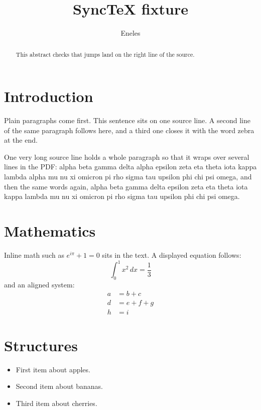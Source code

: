 \documentclass[11pt]{article}
\title{SyncTeX fixture}
\author{Eneles}
\begin{document}
\maketitle
\tableofcontents

\begin{abstract}
This abstract checks that jumps land on the right line of the source.
\end{abstract}

\section{Introduction}
Plain paragraphs come first. This sentence sits on one source line.
A second line of the same paragraph follows here,
and a third one closes it with the word zebra at the end.


One very long source line holds a whole paragraph so that it wraps over several lines in the PDF: alpha beta gamma delta alpha epsilon zeta eta theta iota kappa lambda alpha mu nu xi omicron pi rho sigma tau upsilon phi chi psi omega, and then the same words again, alpha beta gamma delta epsilon zeta eta theta iota kappa lambda mu nu xi omicron pi rho sigma tau upsilon phi chi psi omega.

\section{Mathematics}
Inline math such as $e^{i\pi} + 1 = 0$ sits in the text.
A displayed equation follows:
\begin{equation}
  \int_0^1 x^2 \, dx = \frac{1}{3}
\end{equation}
and an aligned system:
\begin{align}
  a &= b + c \\
  d &= e + f + g \\
  h &= i
\end{align}

\section{Structures}
\begin{itemize}
  \item First item about apples.
  \item Second item about bananas.
  \item Third item about cherries.
\end{itemize}
\end{document}

